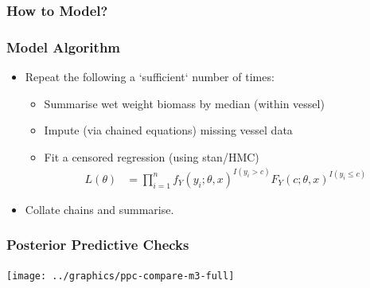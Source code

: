 \documentclass[aspectratio=169]{beamer}
\begin{document}
\begin{frame}
  \frametitle{How to Model?}
\end{frame}

\begin{frame}
  \frametitle{Model Algorithm}
  \begin{itemize}
  \item Repeat the following a `sufficient` number of times:
    \begin{itemize}
    \item Summarise wet weight biomass by median (within vessel)
    \item Impute (via chained equations) missing vessel data
    \item Fit a censored regression (using stan/HMC)
      \begin{align*}
        L(\theta) & = \prod_{i=1}^{n} f_{Y}(y_{i}; \theta, x)^{I(y_{i} > c)} F_{Y}(c; \theta, x)^{I(y_{i} \leq c)}
      \end{align*}
    \end{itemize}
  \item Collate chains and summarise.
  \end{itemize}
\end{frame}


\begin{frame}
  \frametitle{Posterior Predictive Checks}
  \centering
  \texttt{[image: ../graphics/ppc-compare-m3-full]}
\end{frame}
\end{document}
